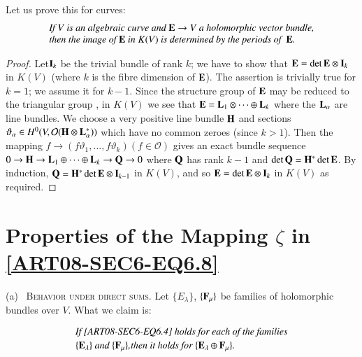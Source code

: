 Let us prove this for curves:
\begin{equation}
\begin{array}{l}
\text{\em If $V$ is an algebraic curve and $\mathbf{E}\to V$ a holomorphic vector bundle,}\\
\text{\em then the image of $\mathbf{E}$ in $K(V)$ is determined by the periods of~ $\mathbf{E}$.}
\end{array}\label{art08-sec6-eq6.14}
\end{equation}

\begin{proof}
Let\pageoriginale $\mathbf{I}_{k}$ be the trivial bundle of rank $k$; we have to show that $\mathbf{E}=\det \mathbf{E}\otimes \mathbf{I}_{k}$ in $K(V)$ (where $k$ is the fibre dimension of $\mathbf{E}$). The assertion is trivially true for $k=1$; we assume it for $k-1$. Since the structure group of $\mathbf{E}$ may be reduced to the triangular group \cite{art08-key2}, in $K(V)$ we see that $\mathbf{E}=\mathbf{L}_{1}\otimes\cdots\oplus \mathbf{L}_{k}$ where the $\mathbf{L}_{\alpha}$ are line bundles. We choose a very positive line bundle $\mathbf{H}$ and sections $\vartheta_{\alpha}\in H^{0}(V,\mathcal{O}(\mathbf{H}\otimes \mathbf{L}^{*}_{\alpha}))$ which have no common zeroes (since $k>1$). Then the mapping $f\to (f\vartheta_{1},\ldots,f\vartheta_{k})(f\in \mathcal{O})$ gives an exact bundle sequence $0\to \mathbf{H}\to \mathbf{L}_{1}\oplus\cdots\oplus \mathbf{L}_{k}\to \mathbf{Q}\to 0$ where $\mathbf{Q}$ has rank $k-1$ and $\det \mathbf{Q}=\mathbf{H}^{*}\det \mathbf{E}$. By induction, $\mathbf{Q}=\mathbf{H}^{*}\det \mathbf{E}\otimes \mathbf{I}_{k-1}$ in $K(V)$, and so $\mathbf{E}=\det \mathbf{E}\otimes \mathbf{I}_{k}$ in $K(V)$ as required.
\end{proof}

\section{Properties of the Mapping \texorpdfstring{$\zeta$}{zeta} in \texorpdfstring{\eqref{ART08-SEC6-EQ6.8}}{eq6.8}}\label{art08-sec7}

(a)~ \textsc{Behavior under direct sums.} Let $\{E_{\lambda}\}$, $\{\mathbf{F}_{\mu}\}$ be families of holomorphic bundles over $V$. What we claim is:

\vfill\eject

\setcounter{equation}{0}
\begin{equation}
\begin{array}{l}
\text{\em If \eqref{ART08-SEC6-EQ6.4} holds for each of the families}\\[2pt]
\text{\em $\{\mathbf{E}_{\lambda}\}$ and $\{\mathbf{F}_{\mu}\}$,then it holds for $\{\mathbf{E}_{\lambda}\oplus \mathbf{F}_{\mu}\}$.}
\end{array}\label{art08-sec7-eq7.1}
\end{equation}

